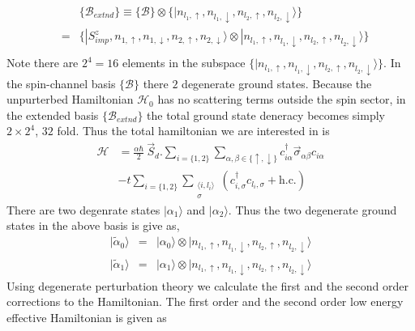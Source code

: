 \documentclass[reprint,prb,superscriptaddress]{revtex4-2}
\begin{document}
\begin{eqnarray}
&&\{\mathcal{B}_{extnd}\} \equiv  \{\mathcal{B}\} \otimes  \{|n_{l_1,\uparrow},n_{l_1,\downarrow},n_{l_2,\uparrow},n_{l_2,\downarrow}\rangle\} \nonumber\\
&=& \{|S^z_{imp},n_{1,\uparrow},n_{1,\downarrow},n_{2,\uparrow},n_{2,\downarrow}\rangle \otimes |n_{l_1,\uparrow},n_{l_1,\downarrow},n_{l_2,\uparrow},n_{l_2,\downarrow}\rangle\} \nonumber\\
\end{eqnarray}
Note there are $2^4=16$ elements in the subspace $\{|n_{l_1,\uparrow},n_{l_1,\downarrow},n_{l_2,\uparrow},n_{l_2,\downarrow}\rangle\}$. In the spin-channel basis $\{\mathcal{B}\}$ there $2$ degenerate ground states. Because the unpurterbed Hamiltonian $\mathcal{H}_0$ has no scattering terms outside the spin sector, in the extended basis $\{\mathcal{B}_{extnd}\}$ the total ground state deneracy becomes simply $2\times 2^4$, $32$ fold. Thus the total hamiltonian we are interested in is 
\begin{align}
\mathcal{H} &= \frac{\alpha\hbar}{2}~ \vec{S}_d. \displaystyle\sum_{i=\{1,2\}} \displaystyle\sum_{\alpha,\beta\in\{\uparrow,\downarrow\}}c_{i\alpha}^{\dagger} \vec{\sigma}_{\alpha\beta} c_{i\alpha}\nonumber\\
	    &-t\displaystyle\sum_{i=\{1,2\}}\displaystyle\sum_{\substack{\langle i,l_i \rangle\\ \sigma}}(c^{\dagger}_{i,\sigma} c_{l_i,\sigma}+ \textrm{h.c.}) 
\end{align}
There are two degenrate states $|\alpha_1\rangle$ and $|\alpha_2\rangle$. Thus the two degenerate ground states in the above basis is give as,
\begin{eqnarray}
|\tilde{\alpha}_0\rangle &=&| {\alpha}_0\rangle\otimes |n_{l_1,\uparrow},n_{l_1,\downarrow},n_{l_2,\uparrow},n_{l_2,\downarrow}\rangle \\
|\tilde{\alpha}_1\rangle &=& | {\alpha}_1\rangle\otimes |n_{l_1,\uparrow},n_{l_1,\downarrow},n_{l_2,\uparrow},n_{l_2,\downarrow}\rangle
\end{eqnarray}
Using degenerate perturbation theory we calculate the first and the second order corrections to the Hamiltonian. The first order and the second order low energy effective Hamiltonian is given as 
\end{document}
